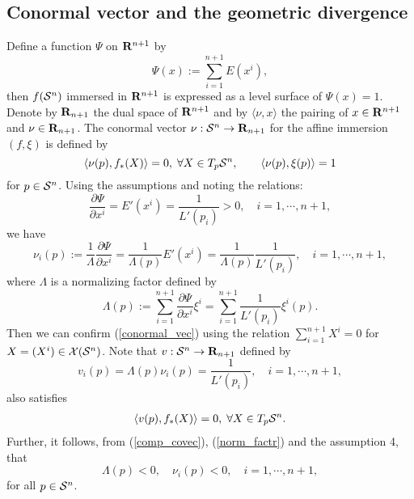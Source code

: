 \documentclass{llncs}
\begin{document}
\subsection{Conormal vector and the geometric divergence}
Define a function $\Psi$ on ${\bf R}^{n+1}$ by
\[
	\Psi(x):=\sum_{i=1}^{n+1} E(x^i),
\]
then $f({\cal S}^n)$ immersed in ${\bf R}^{n+1}$ 
is expressed as a level surface of $\Psi(x)=1$.
Denote by ${\bf R}_{n+1}$ the dual space of ${\bf R}^{n+1}$ and 
by $\langle \nu, x  \rangle$ the pairing of $x \in {\bf R}^{n+1}$ 
and $\nu \in {\bf R}_{n+1}$.
The conormal vector \cite{NS} $\nu: {\cal S}^n \rightarrow {\bf R}_{n+1}$ 
for the affine immersion $(f, \xi)$ is defined by
\begin{equation}
	\langle \nu(p), f_*(X) \rangle=0, \; \forall X \in T_p {\cal S}^n,
	\qquad \langle \nu(p), \xi(p)  \rangle =1
\label{conormal_vec}
\end{equation}
for $p \in {\cal S}^n$.
Using the assumptions and noting the relations:
\[
	\frac{\partial \Psi}{\partial x^i}=E'(x^i)= \frac{1}{L'(p_i)}>0, \quad
	i=1,\cdots, n+1,
\]
we have 
\begin{equation}
	\nu_i(p):=\frac{1}{\Lambda} \frac{\partial \Psi}{\partial x^i}
	=\frac{1}{\Lambda(p)} E'(x^i)
	=\frac{1}{\Lambda(p)} \frac{1}{L'(p_i)}, \quad 	i=1,\cdots, n+1,
\label{comp_covec}
\end{equation}
where $\Lambda$ is a normalizing factor defined by
\begin{equation}
	\Lambda (p):=\sum_{i=1}^{n+1} \frac{\partial \Psi}{\partial x^i} \xi^i
	=\sum_{i=1}^{n+1} \frac{1}{L'(p_i)} \xi ^i(p).
\label{norm_factr}
\end{equation}
Then we can confirm (\ref{conormal_vec}) using 
the relation $\sum_{i=1}^{n+1} X^i =0$ for $X=(X^i) \in {\cal X}({\cal S}^n)$.
Note that $v: {\cal S}^n \rightarrow {\bf R}_{n+1}$ defined by
\[
	v_i(p)=\Lambda(p)\nu_i(p)=\frac{1}{L'(p_i)},  \quad i=1,\cdots,n+1,
\]
also satisfies 
\begin{eqnarray}
	\langle v(p), f_*(X) \rangle=0, \; \forall X \in T_p {\cal S}^n.
\label{orthogonal}
\end{eqnarray}
Further, 
it follows, from (\ref{comp_covec}), (\ref{norm_factr}) 
and the assumption 4, that
\[
	 \Lambda(p)<0, \quad \nu_i(p) <0,  \quad i=1,\cdots,n+1,
\]
for all $p \in {\cal S}^n$.
\end{document}

